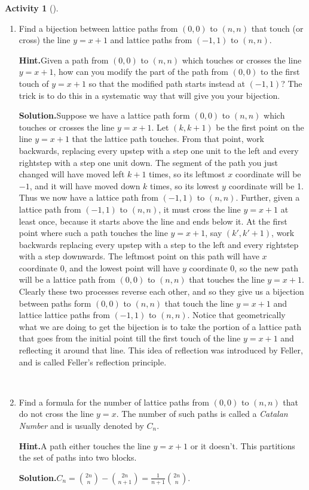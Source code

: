 \documentclass[10pt,]{book}
\theoremstyle{plain}
\theoremstyle{definition}
\newtheorem{activity}[project]{Activity}
\numberwithin{equation}{chapter}
\begin{document}
\begin{activity}[]
\begin{enumerate}[label=(\alph*)]
~\par
\item Find a bijection between lattice paths from \((0,0)\) to \((n,n)\) that touch (or cross) the line \(y=x+1\) and lattice paths from \((-1,1)\) to \((n,n)\).%
\par\medskip\noindent%
\textbf{Hint.}\quad Given a path from \((0, 0)\) to \((n, n)\) which touches or crosses the line \(y = x + 1\), how can you modify the part of the path from \((0, 0)\) to the first touch of \(y = x + 1\) so that the modified path starts instead at \((−1, 1)\)? The trick is to do this in a systematic way that will give you your bijection.%
\par\medskip\noindent%
\textbf{Solution.}\quad Suppose we have a lattice path form \((0,0)\) to \((n,n)\) which touches or crosses the line \(y=x+1\). Let \((k,k+1)\) be the first point on the line \(y=x+1\) that the lattice path touches. From that point, work backwards, replacing every upstep with a step one unit to the left and every rightstep with a step one unit down. The segment of the path you just changed will have moved left \(k+1\) times, so its leftmost \(x\) coordinate will be \(-1\), and it will have moved down \(k\) times, so its lowest \(y\) coordinate will be 1.  Thus we now have a lattice path from \((-1,1)\) to \((n,n)\). Further, given a lattice path from \((-1,1)\) to \((n,n)\), it must cross the line \(y=x+1\) at least once, because it starts above the line and ends below it. At the first point where such a path touches the line \(y=x+1\), say \((k',k'+1)\), work backwards replacing every upstep with a step to the left and every rightstep with a step downwards. The leftmost point on this path will have \(x\) coordinate 0, and the lowest point will have \(y\) coordinate 0, so the new path will be a lattice path from \((0,0)\) to \((n,n)\) that touches the line \(y=x+1\). Clearly these two processes reverse each other, and so they give us a bijection between paths form \((0,0)\) to \((n,n)\) that touch the line \(y=x+1\) and lattice lattice paths from \((-1,1)\) to \((n,n)\). Notice that geometrically what we are doing to get the bijection is to take the portion of a lattice path that goes from the initial point till the first touch of the line \(y=x+1\) and reflecting it around that line. This idea of reflection was introduced by Feller, and is called Feller's reflection principle.%

~\par
\item Find a formula for the number of lattice paths from \((0,0)\) to \((n,n)\) that do not cross the line \(y=x\).  The number of such paths is called a \emph{Catalan Number} and is usually denoted by \(C_n\).%
\par\medskip\noindent%
\textbf{Hint.}\quad A path either touches the line \(y = x + 1\) or it doesn’t. This partitions the set of paths into two blocks.%
\par\medskip\noindent%
\textbf{Solution.}\quad \(C_n=\binom{2n}{n} - \binom{2n}{n+1}=\frac{1}{n+1}\binom{2n}{n}.\)%

\end{enumerate}
\end{activity}
\end{document}
